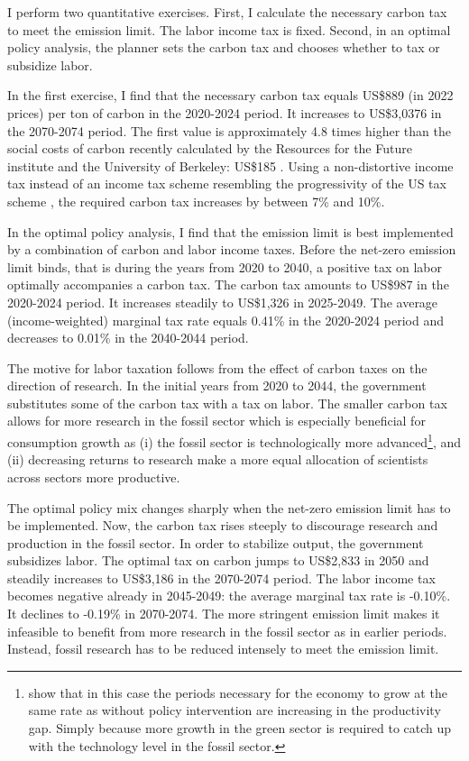I perform two quantitative exercises. First, I calculate the necessary carbon tax to meet the emission limit. The labor income tax is fixed. Second, in an optimal policy analysis, the planner sets the carbon tax and chooses whether to tax or subsidize labor.



In the first exercise, I find that the necessary carbon tax equals US\$889 (in 2022 prices) per ton of carbon in the 2020-2024 period. It increases to US\$3,0376 in the 2070-2074 period. The first value is approximately 4.8 times higher than the social costs of carbon recently calculated by the Resources for the Future institute and the University of Berkeley: US\$185 \citep{RFF}. Using a non-distortive income tax instead of an income tax scheme resembling the progressivity of the US tax scheme \citep[taken from][]{Heathcote2017OptimalFramework},  the required carbon tax increases by between 7\% and 10\%. 


In the optimal policy analysis, I find that the emission limit is best implemented by a combination of carbon and labor income taxes. 
Before the net-zero emission limit binds, that is during the years from 2020 to 2040, a positive tax on labor optimally accompanies a carbon tax. 
The carbon tax amounts to US\$987 in the 2020-2024 period. It increases steadily to US\$1,326 in 2025-2049. The average (income-weighted) marginal tax rate equals 0.41\% in the 2020-2024 period and decreases to 0.01\% in the 2040-2044 period.


The motive for labor taxation follows from the effect of carbon taxes on the direction of research. In the initial years from 2020 to 2044, the government substitutes some of the carbon tax with a tax on labor. The smaller carbon tax allows for more research in the fossil sector which is especially beneficial for consumption growth as (i) the fossil sector is technologically more advanced\footnote{\citep{Acemoglu2012TheChange} show that in this case the periods necessary for the economy to grow at the same rate as without policy intervention are increasing in the productivity gap. Simply because more growth in the green sector is required  to catch up with the technology level in the fossil sector.}, and (ii) decreasing returns to research make a more equal allocation of scientists across sectors more productive. 
 
The optimal policy mix changes sharply when the net-zero emission limit has to be implemented. Now, the carbon tax rises steeply to discourage research and production in the fossil sector. In order to stabilize output, the government subsidizes labor. The optimal tax on carbon jumps to US\$2,833 in 2050 and steadily increases to US\$3,186 in the 2070-2074 period. The labor income tax becomes negative already in 2045-2049: the average marginal tax rate is -0.10\%. It declines to -0.19\% in 2070-2074.
The more stringent emission limit makes it infeasible to benefit from more research in the fossil sector as in earlier periods. Instead, fossil research has to be reduced intensely to meet the emission limit. 

